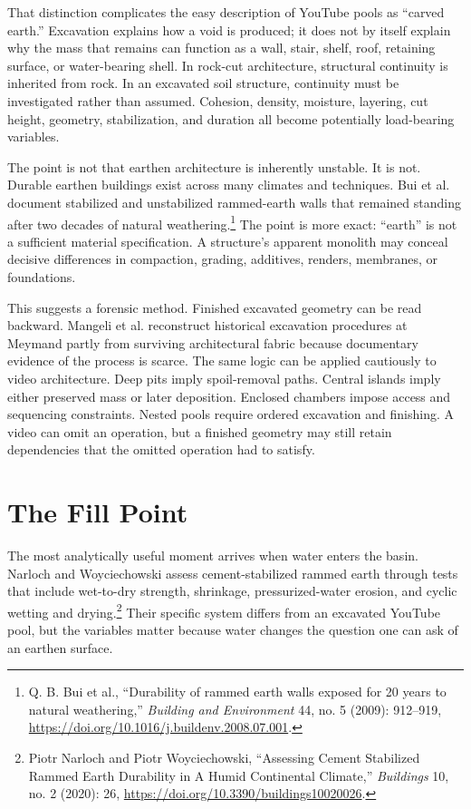 \documentclass[11pt]{article}
\begin{document}
That distinction complicates the easy description of YouTube pools as ``carved earth.'' Excavation explains how a void is produced; it does not by itself explain why the mass that remains can function as a wall, stair, shelf, roof, retaining surface, or water-bearing shell. In rock-cut architecture, structural continuity is inherited from rock. In an excavated soil structure, continuity must be investigated rather than assumed. Cohesion, density, moisture, layering, cut height, geometry, stabilization, and duration all become potentially load-bearing variables.

The point is not that earthen architecture is inherently unstable. It is not. Durable earthen buildings exist across many climates and techniques. Bui et al. document stabilized and unstabilized rammed-earth walls that remained standing after two decades of natural weathering.\footnote{Q. B. Bui et al., ``Durability of rammed earth walls exposed for 20 years to natural weathering,'' \emph{Building and Environment} 44, no. 5 (2009): 912--919, \url{https://doi.org/10.1016/j.buildenv.2008.07.001}.} The point is more exact: ``earth'' is not a sufficient material specification. A structure's apparent monolith may conceal decisive differences in compaction, grading, additives, renders, membranes, or foundations.

This suggests a forensic method. Finished excavated geometry can be read backward. Mangeli et al. reconstruct historical excavation procedures at Meymand partly from surviving architectural fabric because documentary evidence of the process is scarce. The same logic can be applied cautiously to video architecture. Deep pits imply spoil-removal paths. Central islands imply either preserved mass or later deposition. Enclosed chambers impose access and sequencing constraints. Nested pools require ordered excavation and finishing. A video can omit an operation, but a finished geometry may still retain dependencies that the omitted operation had to satisfy.

\section{The Fill Point}

The most analytically useful moment arrives when water enters the basin. Narloch and Woyciechowski assess cement-stabilized rammed earth through tests that include wet-to-dry strength, shrinkage, pressurized-water erosion, and cyclic wetting and drying.\footnote{Piotr Narloch and Piotr Woyciechowski, ``Assessing Cement Stabilized Rammed Earth Durability in A Humid Continental Climate,'' \emph{Buildings} 10, no. 2 (2020): 26, \url{https://doi.org/10.3390/buildings10020026}.} Their specific system differs from an excavated YouTube pool, but the variables matter because water changes the question one can ask of an earthen surface.
\end{document}
